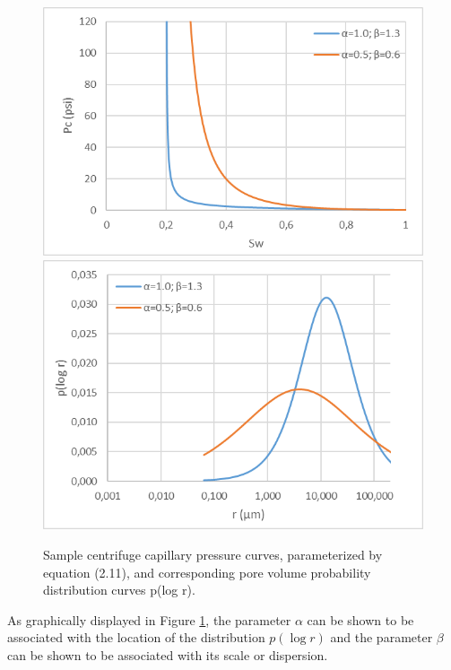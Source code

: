 \documentclass[english,msc,numbers]{coppe}
\begin{document}
  \begin{figure}
  
  {\centering \includegraphics[width=0.7\linewidth]{figure/2-10a-pcc-params-curves} \includegraphics[width=0.7\linewidth]{figure/2-10b-pcc-params-pdf} 
  
  }
  
  \caption{Sample centrifuge capillary pressure curves, parameterized by equation (2.11), and corresponding pore volume probability distribution curves p(log r).}\label{fig:pcc-params}
  \end{figure}
  As graphically displayed in Figure \ref{fig:pcc-params}, the parameter \(\alpha\) can be shown to be associated with the location of the distribution \(p(\log{r})\) and the parameter \(\beta\) can be shown to be associated with its scale or dispersion.
  
\end{document}

